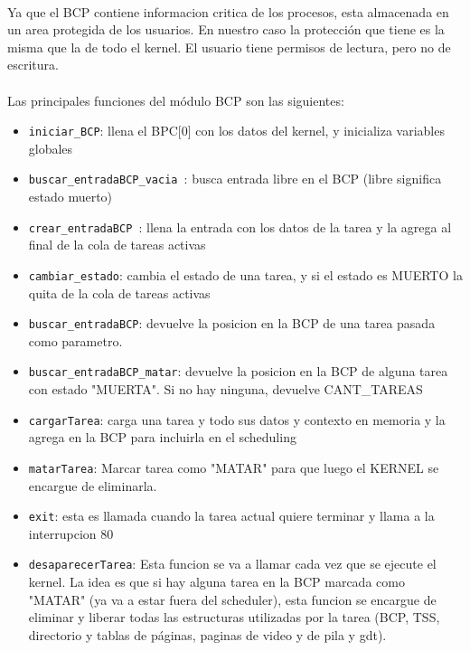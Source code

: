 \documentclass[11pt, a4paper]{article}
\begin{document}
	\paragraph{}
	Ya que el BCP contiene informacion critica de los procesos, esta almacenada en un area protegida de los usuarios. En nuestro caso la protección que tiene es la misma que la de todo el kernel. El usuario tiene permisos de lectura, pero no de escritura.

	\paragraph{}
	Las principales funciones del módulo BCP son las siguientes:

	\begin{itemize}
		\item \texttt{iniciar\_BCP}: llena el BPC[0] con los datos del kernel, y inicializa variables globales
		\item \texttt{buscar\_entradaBCP\_vacia }: busca entrada libre en el BCP (libre significa estado muerto)
		\item \texttt{crear\_entradaBCP }: llena la entrada con los datos de la tarea y la agrega al final de la cola de tareas activas
		\item \texttt{cambiar\_estado}: cambia el estado de una tarea, y si el estado es MUERTO la quita de la cola de tareas activas
		\item \texttt{buscar\_entradaBCP}: devuelve la posicion en la BCP de una tarea pasada como parametro.
		\item \texttt{buscar\_entradaBCP\_matar}: devuelve la posicion en la BCP de alguna tarea con estado "MUERTA". Si no hay ninguna, devuelve CANT\_TAREAS
		\item \texttt{cargarTarea}: carga una tarea y todo sus datos y contexto en memoria y la agrega en la BCP para incluirla en el scheduling
		\item \texttt{matarTarea}: Marcar tarea como "MATAR" para que luego el KERNEL se encargue de eliminarla. 
		\item \texttt{exit}:  esta es llamada cuando la tarea actual quiere terminar y llama a la interrupcion 80
		\item \texttt{desaparecerTarea}: Esta funcion se va a llamar cada vez que se ejecute el kernel. La idea es que si hay alguna tarea en la BCP marcada como "MATAR" (ya va a estar fuera del scheduler), esta funcion se encargue de eliminar y liberar todas las estructuras utilizadas por la tarea (BCP, TSS, directorio y tablas de páginas, paginas de video y de pila y gdt).
	\end{itemize}
\end{document}
